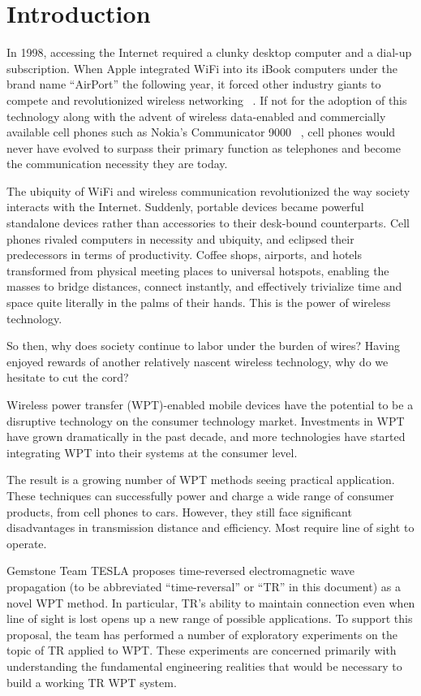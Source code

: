 \chapter{Introduction}
\label{ch:introduction}

In 1998, accessing the Internet required a clunky desktop computer and a dial-up
subscription. When Apple integrated WiFi into its iBook computers under the
brand name ``AirPort'' the following year, it forced other industry giants to
compete and revolutionized wireless networking ~\cite{_brief_2004}. If not for
the adoption of this technology along with the advent of wireless data-enabled
and commercially available cell phones such as Nokia's Communicator 9000
~\cite{_first_1996}, cell phones would never have evolved to surpass their
primary function as telephones and become the communication necessity they are
today.

The ubiquity of WiFi and wireless communication revolutionized the way society
interacts with the Internet. Suddenly, portable devices became powerful
standalone devices rather than accessories to their desk-bound counterparts.
Cell phones rivaled computers in necessity and ubiquity, and eclipsed their
predecessors in terms of productivity. Coffee shops, airports, and hotels
transformed from physical meeting places to universal hotspots, enabling the
masses to bridge distances, connect instantly, and effectively trivialize time
and space quite literally in the palms of their hands. This is the power of
wireless technology.

So then, why does society continue to labor under the burden of wires? Having
enjoyed rewards of another relatively nascent wireless technology, why do we
hesitate to cut the cord?

Wireless power transfer (WPT)-enabled mobile devices have the potential to be a
disruptive technology on the consumer technology market.  Investments in WPT
have grown dramatically in the past decade, and more technologies have started
integrating WPT into their systems at the consumer level.

The result is a growing number of WPT methods seeing practical application.
These techniques can successfully power and charge a wide range of consumer
products, from cell phones to cars.  However, they still face significant
disadvantages in transmission distance and efficiency.  Most require line of
sight to operate.

Gemstone Team TESLA proposes time-reversed electromagnetic wave propagation (to
be abbreviated ``time-reversal'' or ``TR'' in this document) as a novel WPT method.
In particular, TR's ability to maintain connection even when line of sight is
lost opens up a new range of possible applications.  To support this proposal,
the team has performed a number of exploratory experiments on the topic of TR
applied to WPT.  These experiments are concerned primarily with understanding
the fundamental engineering realities that would be necessary to build a working
TR WPT system.

